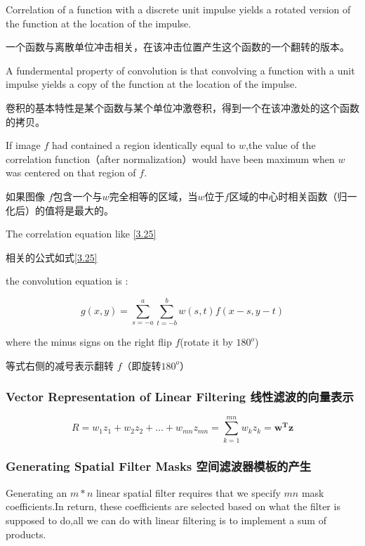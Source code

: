 \documentclass[12pt]{article}
\numberwithin{equation}{section}%
\begin{document}
Correlation of a function with a discrete unit impulse yields a rotated version of the function at the location of the impulse.

一个函数与离散单位冲击相关，在该冲击位置产生这个函数的一个翻转的版本。

A fundermental property of convolution is that convolving a function with a unit impulse yields a copy of the function at the location of the impulse.

卷积的基本特性是某个函数与某个单位冲激卷积，得到一个在该冲激处的这个函数的拷贝。

If image $f$ had contained a region identically equal to $w$,the value of the correlation function（after normalization）would have been maximum when $w$ was centered on that region of $f$.

如果图像 $f$包含一个与$w$完全相等的区域，当$w$位于$f$区域的中心时相关函数（归一化后）的值将是最大的。

The correlation equation like \ref{3.25}

相关的公式如式\ref{3.25}

the convolution equation is :

\begin{equation} \label {3.26}
g(x,y)=\sum_{s=-a}^{a}\sum_{t=-b}^{b}w(s,t)f(x-s,y-t)
\end{equation}

where the minus signs on the right flip $f$(rotate it by $180^{o}$)

等式右侧的减号表示翻转 $f$（即旋转$180^{o}$）

\subsubsection{Vector Representation of Linear Filtering 线性滤波的向量表示}

\begin{equation} \label {3.27}
R=w_{1}z_{1}+w_{2}z_{2}+\ldots +w_{mn}z_{mn}
=\sum_{k=1}^{mn}w_{k}z_{k}
=\boldsymbol{w^{T}z}
\end{equation}

\subsubsection{Generating Spatial Filter Masks 空间滤波器模板的产生}

Generating an $m*n$ linear spatial filter requires  that we specify $mn$ mask coefficients.In return, these coefficients are selected based on what the filter is supposed to do,all we can do with linear filtering is to implement a sum of products.
\end{document}
